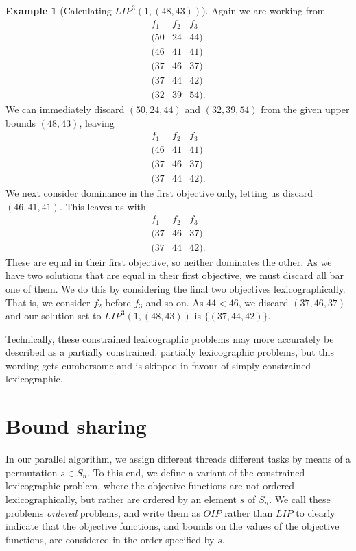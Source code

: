 \documentclass{amsart}
\theoremstyle{definition}
\newtheorem{example}{Example}
\begin{document}
\begin{example}[Calculating ${LI\!P}^3(1, (48, 43))$]\label{ex:lip2}
  Again we are working from 
\[
\begin{array}{ccc}
  f_1 & f_2 & f_3 \\ \hline
  (50 & 24 & 44) \\
  (46 & 41 & 41) \\
  (37 & 46 & 37) \\
  (37 & 44 & 42) \\
  (32 & 39 & 54).
\end{array}
\]
  We can immediately discard $(50, 24, 44)$ and $(32, 39, 54)$ from the given upper bounds $(48, 43)$, leaving
\[
\begin{array}{c|cc}
  f_1 & f_2 & f_3 \\ \hline
  (46 & 41 & 41) \\
  (37 & 46 & 37) \\
  (37 & 44 & 42).
\end{array}
\]
  We next consider dominance in the first objective only, letting us discard $(46, 41, 41)$.
  This leaves us with
\[
\begin{array}{c|cc}
  f_1 & f_2 & f_3 \\ \hline
  (37 & 46 & 37) \\
  (37 & 44 & 42).
\end{array}
\]
  These are equal in their first objective, so neither dominates the other.
  As we have two solutions that are equal in their first objective, we must discard all bar one of them.
  We do this by considering the final two objectives lexicographically.
  That is, we consider $f_2$ before $f_3$ and so-on.
  As $44 < 46$, we discard $(37, 46, 37)$ and our solution set to ${LI\!P}^3(1, (48, 43))$ is $\{ (37, 44, 42)\}$.
\end{example}

Technically, these constrained lexicographic problems may more accurately be described as a partially constrained, partially lexicographic problems, but this wording gets cumbersome and is skipped in favour of simply constrained lexicographic.

\section{Bound sharing}\label{sec:sharing}
In our parallel algorithm, we assign different threads different tasks by means of a permutation $s \in S_n$.
To this end, we define a variant of the constrained lexicographic problem, where the objective functions are not ordered lexicographically, but rather are ordered by an element $s$ of $S_n$.
We call these problems {\em ordered} problems, and write them as ${O\!I\!P}$ rather than ${LI\!P}$ to clearly indicate that the objective functions, and bounds on the values of the objective functions, are considered in the order specified by $s$. 
\end{document}
